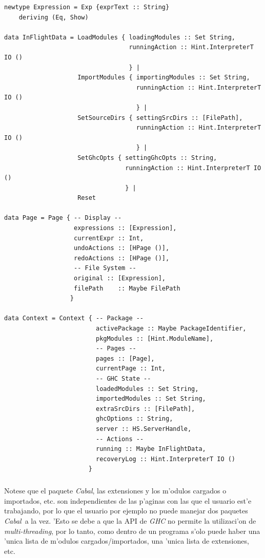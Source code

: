 \documentclass[a4paper]{article}
\newcommand{\cabal}{\textsl{Cabal}}
\begin{document}
\begin{lstlisting}
newtype Expression = Exp {exprText :: String}       
    deriving (Eq, Show)

data InFlightData = LoadModules { loadingModules :: Set String,
                                  runningAction :: Hint.InterpreterT IO ()
                                  } |
                    ImportModules { importingModules :: Set String,
                                    runningAction :: Hint.InterpreterT IO ()
                                    } | 
                    SetSourceDirs { settingSrcDirs :: [FilePath],
                                    runningAction :: Hint.InterpreterT IO ()
                                    } |
                    SetGhcOpts { settingGhcOpts :: String,
                                 runningAction :: Hint.InterpreterT IO ()
                                 } |
                    Reset

data Page = Page { -- Display --
                   expressions :: [Expression],
                   currentExpr :: Int,
                   undoActions :: [HPage ()],
                   redoActions :: [HPage ()],
                   -- File System --
                   original :: [Expression],
                   filePath    :: Maybe FilePath
                  }
                  
data Context = Context { -- Package --
                         activePackage :: Maybe PackageIdentifier,
                         pkgModules :: [Hint.ModuleName],
                         -- Pages --
                         pages :: [Page],
                         currentPage :: Int,
                         -- GHC State --
                         loadedModules :: Set String,
                         importedModules :: Set String,
                         extraSrcDirs :: [FilePath],
                         ghcOptions :: String,
                         server :: HS.ServerHandle,
                         -- Actions --
                         running :: Maybe InFlightData,
                         recoveryLog :: Hint.InterpreterT IO ()
                       }
\end{lstlisting}
\subparagraph{}Notese que el paquete \cabal, las extensiones y los m'odulos cargados o importados, etc. son independientes de las p'aginas con las que el usuario est'e trabajando, por lo que el usuario por ejemplo no puede manejar dos paquetes \cabal\ a la vez.  'Esto se debe a que la API de \textsl{GHC} no permite la utilizaci'on de \textsl{multi-threading}, por lo tanto, como dentro de un programa s'olo puede haber una 'unica lista de m'odulos cargados/importados, una 'unica lista de extensiones, etc.
\end{document}
